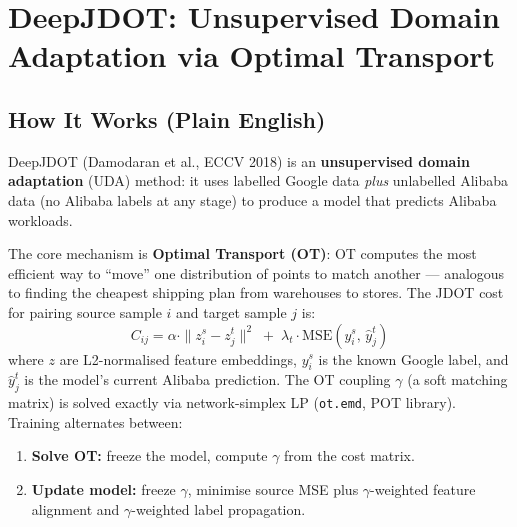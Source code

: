 \documentclass[12pt,a4paper]{article}
\begin{document}
\section{\textcolor{djdotcolor}{DeepJDOT}: Unsupervised Domain Adaptation via Optimal Transport}
\label{sec:deepjdot}

\subsection{How It Works (Plain English)}

DeepJDOT (Damodaran et al., ECCV 2018) is an \textbf{unsupervised domain adaptation}
(UDA) method: it uses labelled Google data \emph{plus} unlabelled Alibaba data
(no Alibaba labels at any stage) to produce a model that predicts Alibaba workloads.

The core mechanism is \textbf{Optimal Transport (OT)}: OT computes the most efficient
way to ``move'' one distribution of points to match another --- analogous to finding
the cheapest shipping plan from warehouses to stores.  The JDOT cost for pairing
source sample $i$ and target sample $j$ is:
\[
  C_{ij} = \alpha \cdot \|z_i^s - z_j^t\|^2
          \;+\; \lambda_t \cdot \mathrm{MSE}\!\left(y_i^s,\, \hat{y}_j^t\right)
\]
where $z$ are L2-normalised feature embeddings, $y_i^s$ is the known Google label,
and $\hat{y}_j^t$ is the model's current Alibaba prediction.  The OT coupling $\gamma$
(a soft matching matrix) is solved exactly via network-simplex LP (\texttt{ot.emd},
POT library).  Training alternates between:
\begin{enumerate}[leftmargin=*]
  \item \textbf{Solve OT:} freeze the model, compute $\gamma$ from the cost matrix.
  \item \textbf{Update model:} freeze $\gamma$, minimise source MSE plus
        $\gamma$-weighted feature alignment and $\gamma$-weighted label propagation.
\end{enumerate}
\end{document}
